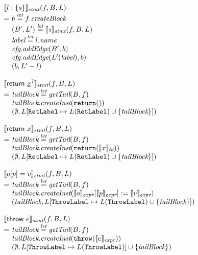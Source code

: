 \[\begin{array}{l@{}l@{~}l}
\lefteqn{\transfun{\irlabel{l}{s}}_{\emph{stmt}}(f, B, L)}\\
& = & b \letval f.\emph{createBlock}\\
& & (B', L') \letval \transfun{s}_{\emph{stmt}}(f, B, L)\\
& & \emph{label} \letval l.\emph{name}\\
& & \emph{cfg}.\emph{addEdge}(B', b)\\
& & \emph{cfg}.\emph{addEdge}(L'(\emph{label}), b)\\
& & (b, L' - l)\\
& & \\

\lefteqn{\transfun{\irreturn{}}_{\emph{stmt}}(f, B, L)}\\
& = & \emph{tailBlock} \letval \getTail(B, f)\\
& & \emph{tailBlock}.\emph{createInst}(\TT{return}())\\
& & (\emptyset, L[\RetLabel \mapsto L(\RetLabel) \cup \{ \emph{tailBlock}\}])\\
& & \\

\lefteqn{\transfun{\ircfgreturn{x}}_{\emph{stmt}}(f, B, L)}\\
& = & \emph{tailBlock} \letval \getTail(B, f)\\
& & \emph{tailBlock}.\emph{createInst}(\TT{return}(\transfun{x}_{\emph{id}}))\\
& & (\emptyset, L[\RetLabel \mapsto L(\RetLabel) \cup \{ \emph{tailBlock}\}])\\
& & \\

\lefteqn{\transfun{\irstore{o}{p}{v}}_{\emph{stmt}}(f, B, L)}\\
& = & \emph{tailBlock} \letval \getTail(B, f)\\
& & \emph{tailBlock}.\emph{createInst}(\transfun{o}_{\emph{expr}}[\transfun{p}_{\emph{expr}}] := \transfun{v}_{\emph{expr}})\\
& & (\emph{tailBlock}, L[\ThrowLabel \mapsto L(\ThrowLabel) \cup \{ \emph{tailBlock} \}])\\
& & \\

\lefteqn{\transfun{\irthrow{e}}_{\emph{stmt}}(f, B, L)}\\
& = & \emph{tailBlock} \letval \getTail(B, f)\\
& & \emph{tailBlock}.\emph{createInst}(\TT{throw}(\transfun{e}_{\emph{expr}}))\\
& & (\emptyset, L[\ThrowLabel \mapsto L(\ThrowLabel)] \cup \{ \emph{tailBlock} \})\\
& & \\
\end{array}
\]

